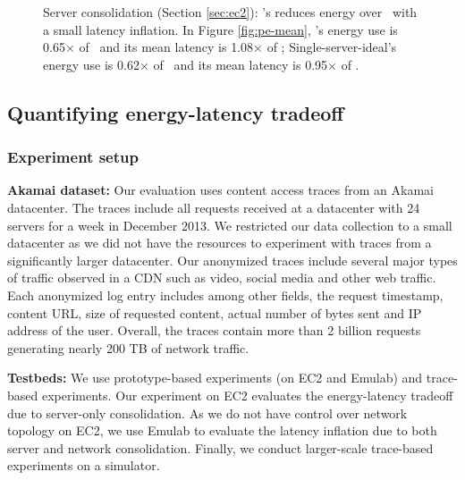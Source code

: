 \begin{figure}
        \caption{Server consolidation (Section \ref{sec:ec2}):  \shrink's reduces energy over \peakS\ with a small latency inflation. In Figure \ref{fig:pe-mean}, \shrink's energy use is 0.65$\times$ of \peakS\ and its mean latency is 1.08$\times$ of \peakS; Single-server-ideal's energy use is 0.62$\times$  of \peakS\ and its mean latency is 0.95$\times$ of \peakS.}
        \label{fig:pe}
\end{figure}

\subsection{Quantifying energy-latency tradeoff}
\label{sec:quantify}
\vspace{-0.1in}
\subsubsection{Experiment setup}
\label{sec:setup}
\textbf{Akamai dataset:} Our evaluation uses content access traces from an Akamai datacenter. The traces include all requests received at a datacenter with 24 servers for a week in December 2013. We restricted our data collection to a small datacenter as we did not have the resources to experiment with traces from a significantly larger datacenter. Our anonymized traces include several major types of traffic observed in a CDN such as video, social media and other web traffic. Each anonymized log entry includes among other fields, the request timestamp, content URL, size of requested content, actual number of bytes sent and IP address of the user. Overall, the traces contain more than 2 billion requests generating nearly 200 TB of network traffic.

\textbf{Testbeds:} We use prototype-based experiments (on EC2 and Emulab) and trace-based experiments. Our experiment on EC2 evaluates the energy-latency tradeoff due to server-only consolidation. As we do not have control over network topology on EC2, we use Emulab to evaluate the latency inflation due to both server and network consolidation. Finally, we conduct larger-scale trace-based experiments on a simulator.








